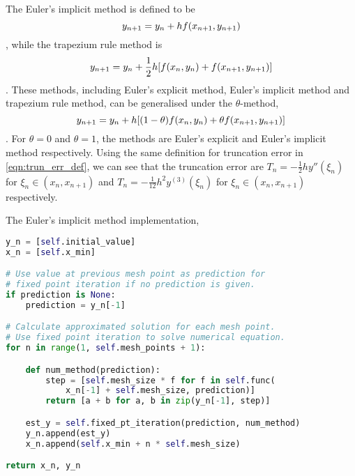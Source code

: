 The Euler's implicit method is defined to be
\begin{equation}
    y_{n+1} = y_n + hf(x_{n+1},y_{n+1})\\
\end{equation}
, while the trapezium rule method is
\begin{equation}
    y_{n+1} = y_n + \frac{1}{2}h[f(x_n,y_n) + f(x_{n+1},y_{n+1})]\\
\end{equation}
. These methods, including Euler's explicit method, Euler's implicit method and trapezium rule method, can be generalised under the $\theta$-method,
\begin{equation}
    y_{n+1} = y_n + h[(1-\theta)f(x_n,y_n) + \theta f(x_{n+1},y_{n+1})]\\
\end{equation}
. For $\theta = 0$ and $\theta = 1$, the methods are Euler's explicit and Euler's implicit method respectively. Using the same definition for truncation error in \ref{eqn:trun_err_def}, we can see that the truncation error are $T_n = -\frac{1}{2}hy''(\xi_n)$ for $\xi_n \in (x_n, x_{n+1})$ and $T_n = -\frac{1}{12}h^2y^{(3)}(\xi_n)$ for $\xi_n \in (x_n, x_{n+1})$ respectively.

The Euler's implicit method implementation,
\begin{lstlisting}[language=Python]
y_n = [self.initial_value]
x_n = [self.x_min]

# Use value at previous mesh point as prediction for
# fixed point iteration if no prediction is given.
if prediction is None:
    prediction = y_n[-1]

# Calculate approximated solution for each mesh point.
# Use fixed point iteration to solve numerical equation.
for n in range(1, self.mesh_points + 1):

    def num_method(prediction):
        step = [self.mesh_size * f for f in self.func(
            x_n[-1] + self.mesh_size, prediction)]
        return [a + b for a, b in zip(y_n[-1], step)]

    est_y = self.fixed_pt_iteration(prediction, num_method)
    y_n.append(est_y)
    x_n.append(self.x_min + n * self.mesh_size)

return x_n, y_n
\end{lstlisting}


